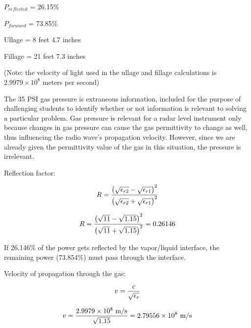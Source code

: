 





$P_{reflected}$ = 26.15\%

\vskip 10pt

$P_{forward}$ = 73.85\%

\vskip 10pt

Ullage = 8 feet 4.7 inches

\vskip 10pt

Fillage = 21 feet 7.3 inches

\vskip 10pt

(Note: the velocity of light used in the ullage and fillage calculations is $2.9979 \times 10^8$ meters per second)

\vskip 10pt

The 35 PSI gas pressure is extraneous information, included for the purpose of challenging students to identify whether or not information is relevant to solving a particular problem.  Gas pressure is relevant for a radar level instrument only because changes in gas pressure can cause the gas permittivity to change as well, thus influencing the radio wave's propagation velocity.  However, since we are already given the permittivity value of the gas in this situation, the pressure is irrelevant.







Reflection factor:

$$R = {\left({\sqrt{\epsilon_{r2}} - \sqrt{\epsilon_{r1}}}\right)^2 \over \left(\sqrt{\epsilon_{r2}} + \sqrt{\epsilon_{r1}}\right)^2}$$

$$R = {\left({\sqrt{11} - \sqrt{1.15}}\right)^2 \over \left(\sqrt{11} + \sqrt{1.15}\right)^2} = 0.26146$$

If 26.146\% of the power gets reflected by the vapor/liquid interface, the remaining power (73.854\%) must pass through the interface.

\vskip 10pt

Velocity of propagation through the gas:

$$v = {c \over \sqrt{\epsilon_r}}$$

$$v = {2.9979 \times 10^8 \hbox{ m/s} \over \sqrt{1.15}} = 2.79556 \times 10^8 \hbox{ m/s}$$

\vskip 10pt

